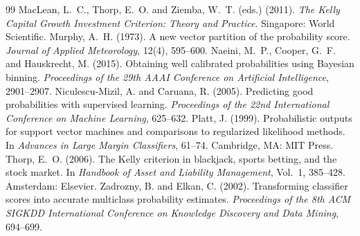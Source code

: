 \documentclass[11pt,a4paper]{article}
\begin{document}
\begin{thebibliography}{99}
 MacLean, L.~C., Thorp, E.~O. and Ziemba, W.~T. (eds.) (2011). \emph{The Kelly Capital Growth Investment Criterion: Theory and Practice}. Singapore: World Scientific.
 Murphy, A.~H. (1973). A new vector partition of the probability score. \emph{Journal of Applied Meteorology}, 12(4), 595--600.
 Naeini, M.~P., Cooper, G.~F. and Hauskrecht, M. (2015). Obtaining well calibrated probabilities using Bayesian binning. \emph{Proceedings of the 29th AAAI Conference on Artificial Intelligence}, 2901--2907.
 Niculescu-Mizil, A. and Caruana, R. (2005). Predicting good probabilities with supervised learning. \emph{Proceedings of the 22nd International Conference on Machine Learning}, 625--632.
 Platt, J. (1999). Probabilistic outputs for support vector machines and comparisons to regularized likelihood methods. In \emph{Advances in Large Margin Classifiers}, 61--74. Cambridge, MA: MIT Press.
 Thorp, E.~O. (2006). The Kelly criterion in blackjack, sports betting, and the stock market. In \emph{Handbook of Asset and Liability Management}, Vol.~1, 385--428. Amsterdam: Elsevier.
 Zadrozny, B. and Elkan, C. (2002). Transforming classifier scores into accurate multiclass probability estimates. \emph{Proceedings of the 8th ACM SIGKDD International Conference on Knowledge Discovery and Data Mining}, 694--699.
\end{thebibliography}
\end{document}
